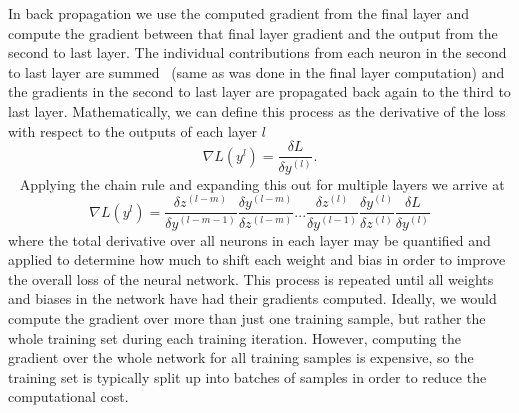 %
%
In back propagation we use the computed gradient from the final layer and compute the 
gradient between that final layer gradient and the output from the second to last layer. 
The individual contributions from each neuron in the second to last layer are 
summed~ 
(same as was done in the final layer computation) and the gradients in the 
second to last layer are propagated back again to the third to last layer. Mathematically, 
we can define this process as the derivative of the loss with respect to the outputs of each layer $l$
\begin{equation}
    \nabla L(y^{l}) = \frac{\delta L}{\delta y^{(l)}}.
\end{equation}{}
~
Applying the chain rule and expanding this out for multiple layers we arrive at
\begin{equation}
    \nabla L(y^{l}) = \frac{\delta z^{(l-m)}}{\delta y^{(l-m-1)}} \frac{\delta y^{(l-m)}}{\delta z^{(l-m)}} ... \frac{\delta z^{(l)}}{\delta y^{(l-1)}} \frac{\delta y^{(l)}}{\delta z^{(l)}} \frac{\delta L}{\delta y^{(l)}} 
\end{equation}{}
where the total derivative over all neurons in each layer may be quantified and 
applied to determine how much to shift each weight and bias in order to improve the 
overall loss of the neural network. This process is repeated until all weights and biases in 
the network have had their gradients computed. Ideally, we would compute the gradient 
over more than just one training sample, but rather the whole training set 
during each training iteration. However, computing the gradient over the 
whole network for all training samples is expensive, so the training set 
is typically split up into batches of samples in order to reduce the computational cost.

